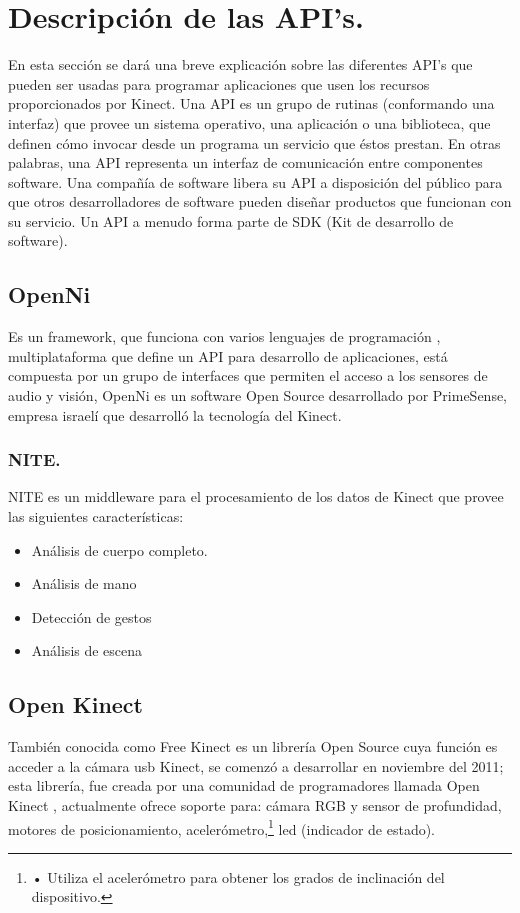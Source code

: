 \documentclass[11pt,a4paper]{article}
\begin{document}
\section{Descripción de las API's.}
En esta sección se dará una breve explicación sobre las diferentes API's que pueden ser usadas para programar aplicaciones que usen los recursos proporcionados por Kinect. 
Una API es un grupo de rutinas (conformando una interfaz) que provee un sistema operativo, una aplicación o una biblioteca, que definen cómo invocar desde  un programa un servicio que éstos prestan. En otras palabras, una API representa un interfaz de comunicación entre componentes software. Una compañía de software libera su API a disposición del público para que otros desarrolladores de software pueden diseñar productos que funcionan con su servicio. Un API a menudo forma parte de SDK (Kit de desarrollo de software)\cite{Diccionario}.

\subsection{OpenNi}
Es un \gls{framework}, que funciona con varios lenguajes de programación , \gls{multiplataforma} que define un API para desarrollo de aplicaciones, está compuesta por un grupo de interfaces que permiten el acceso a los sensores de audio y visión, OpenNi es un software Open Source desarrollado por PrimeSense, empresa israelí que desarrolló la tecnología del Kinect.

\subsubsection{NITE.}
NITE es un \gls{middleware} para el procesamiento de los datos de Kinect que provee las siguientes características:
\begin{itemize}
	\item Análisis de cuerpo completo.
	\item Análisis de mano
	\item Detección de gestos 
	\item Análisis de escena 
\end{itemize} 

\subsection{Open Kinect}
También conocida como Free Kinect es un librería Open Source cuya función es acceder a la cámara usb Kinect, se comenzó a desarrollar en noviembre del 2011; esta librería, fue creada por una comunidad de programadores llamada Open Kinect \cite{openkinect}, actualmente ofrece soporte para:
cámara RGB y sensor de profundidad,
motores de posicionamiento,
acelerómetro,\footnote{• Utiliza el acelerómetro para obtener los grados de inclinación del dispositivo.}
led (indicador de estado).
\end{document}
